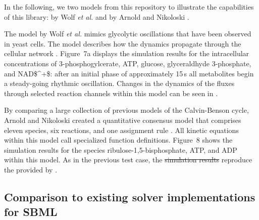 \documentclass[10pt]{bmc_article}
\newenvironment{bmcformat}{\begin{raggedright}\baselineskip20pt\sloppy\setboolean{publ}{false}}{\end{raggedright}\baselineskip20pt\sloppy}
\begin{document}
\begin{bmcformat}
In the following, we  two models 
from this repository to illustrate the capabilities of this library:
 by Wolf \emph{et al.} \cite{Wolf2000}
and  by Arnold 
and Nikoloski \cite{Arnold2011}.

The model by Wolf \emph{et al.} \cite{Wolf2000} mimics glycolytic oscillations
that have been observed in yeast cells.
The model describes how the dynamics propagate through the cellular network
.
Figure~7a displays the simulation results for the intracellular concentrations
of 3-phosphogylcerate, \acs{ATP}, glucose, glyceraldhyde 3-phosphate, and 
\acs{NAD$^+$}:
after an initial phase of approximately 15\,s all metabolites begin a
steady-going rhythmic oscillation.
Changes in the dynamics of the fluxes through selected reaction channels within
this model can be seen in . 

By comparing a large collection of previous models of the Calvin-Benson
cycle, Arnold and Nikoloski created a quantitative consensus model that
comprises eleven species, six reactions, and one assignment rule
\cite{Arnold2011}.
All kinetic equations within this model call specialized function definitions.
Figure~8 shows the simulation results for the species ribulose-1,5-bisphosphate,
\acs{ATP}, and \acs{ADP} within this model.
As in the previous test case, the
\sout{simulation results}
reproduce the  provided by .  

\subsection*{Comparison to existing solver implementations for SBML}


\end{bmcformat}
\end{document}
